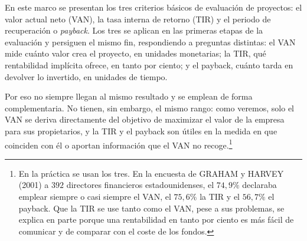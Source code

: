 \documentclass[10pt,a4paper]{article}
\begin{document}
En este marco se presentan los tres criterios básicos de evaluación de proyectos: el valor actual neto (VAN), la tasa interna de retorno (TIR) y el periodo de recuperación o \textit{payback}. Los tres se aplican en las primeras etapas de la evaluación y persiguen el mismo fin, respondiendo a preguntas distintas: el VAN mide cuánto valor crea el proyecto, en unidades monetarias; la TIR, qué rentabilidad implícita ofrece, en tanto por ciento; y el payback, cuánto tarda en devolver lo invertido, en unidades de tiempo. 

Por eso no siempre llegan al mismo resultado y se emplean de forma complementaria. No tienen, sin embargo, el mismo rango: como veremos, solo el VAN se deriva directamente del objetivo de maximizar el valor de la empresa para sus propietarios, y la TIR y el payback son útiles en la medida en que coinciden con él o aportan información que el VAN no recoge.\footnote{%
    En la práctica se usan los tres. En la encuesta de GRAHAM y HARVEY (2001) a $392$ directores financieros estadounidenses, el $74,9\%$ declaraba emplear siempre o casi siempre el VAN, el $75,6\%$ la TIR y el $56,7\%$ el payback. Que la TIR se use tanto como el VAN, pese a sus problemas, se explica en parte porque una rentabilidad en tanto por ciento es más fácil de comunicar y de comparar con el coste de los fondos.
}
\end{document}
